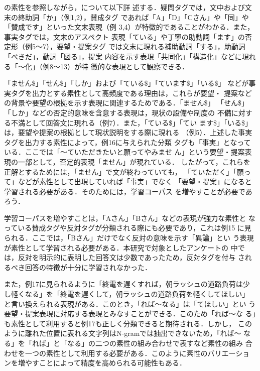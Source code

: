 の素性を参照しながら，について以下詳
述する．疑問タグでは，文中および文末の終助詞「か」（例1,2），賛成タグ
であれば「A」「D」「Cさん」や「同」や「賛成です」といった文末表現（例
3,4）が特徴的であることがわかる．また，事実タグでは，文末のアスペクト
表現「ている」や丁寧の助動詞「ます」の否定形（例5〜7），要望・提案タグ
では文末に現れる補助動詞「する」，助動詞「べきだ」，動詞「図る」，提案
内容を示す表現「共同化」「構造化」などに現れる「〜化」（例8〜13）が特
徴的な表現として観察できる．

「ません\$」「せん\$」「しか」および「ている\$」「ています\$」「いる\$」
などが事実タグを出力とする素性として高頻度である理由は，これらが要望・
提案などの背景や要望の根拠を示す表現に関連するためである．「ません\$」
「せん\$」「しか」などの否定的意味を含意する表現は，現状の設備や制度の
不備に対する不満として回答文に現れる（例7）．また，「ている\$」「てい
ます\$」「いる\$」は，要望や提案の根拠として現状説明をする際に現れる
（例5）．上述した事実タグを出力する素性によって，例16に与えられた分類
タグも「事実」となっている．ここでは「〜ていただきたいと願ってやみませ
ん」という要望・提案表現の一部として，否定的表現「ません」が現れている．
したがって，これらを正解とするためには，「ません」で文が終わっていても，
「ていただく」「願って」などが素性として出現していれば「事実」でなく
「要望・提案」になると学習される必要がある．そのためには，学習コーパス
を増やすことが必要であろう．

学習コーパスを増やすことは，「Aさん」「Bさん」などの表現が強力な素性と
なっている賛成タグや反対タグが分類される際にも必要であり，これは例15 
に見られる．ここでは，「Bさん」だけでなく反対の意味を示す「異論」とい
う表現が素性として学習される必要がある．本研究で対象としたアンケートの
中では，反対を明示的に表明した回答文は少数であったため，反対タグを付与
されるべき回答の特徴が十分に学習されなかった．

また，例17に見られるように「終電を遅くすれば，朝ラッシュの道路負荷は少
し軽くなる」を「終電を遅くして，朝ラッシュの道路負荷を軽くしてほしい」
と言い換えられる表現がある．このとき，「れば〜なる」は「てほしい」とい
う要望・提案表現に対応する表現とみなすことができる．このため「れば〜な
る」も素性として利用すると例17も正しく分類できると期待される．しかし，
このように離れた位置に表れる文字列はN-gramでは抽出できないため，「れば〜
なる」を「れば」と「なる」の二つの素性の組み合わせで表すなど素性の組み
合わせを一つの素性として利用する必要がある．このように素性のバリエーショ
ンを増やすことによって精度を高められる可能性もある．

